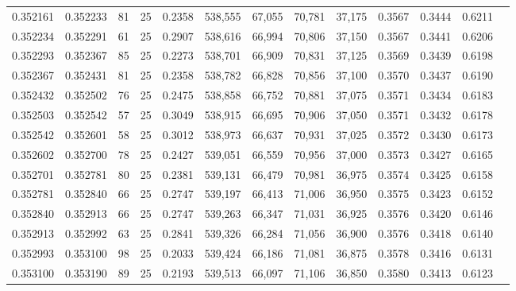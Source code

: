 \begin{tabular}{rrrrrrrrrrrrr}
0.352161 & 0.352233 &    81 &  25 &                                     0.2358 & 538,555 &  67,055 &  70,781 &  37,175 & 0.3567 & 0.3444 & 0.6211 \\
0.352234 & 0.352291 &    61 &  25 &                                     0.2907 & 538,616 &  66,994 &  70,806 &  37,150 & 0.3567 & 0.3441 & 0.6206 \\
0.352293 & 0.352367 &    85 &  25 &                                     0.2273 & 538,701 &  66,909 &  70,831 &  37,125 & 0.3569 & 0.3439 & 0.6198 \\
0.352367 & 0.352431 &    81 &  25 &                                     0.2358 & 538,782 &  66,828 &  70,856 &  37,100 & 0.3570 & 0.3437 & 0.6190 \\
0.352432 & 0.352502 &    76 &  25 &                                     0.2475 & 538,858 &  66,752 &  70,881 &  37,075 & 0.3571 & 0.3434 & 0.6183 \\
0.352503 & 0.352542 &    57 &  25 &                                     0.3049 & 538,915 &  66,695 &  70,906 &  37,050 & 0.3571 & 0.3432 & 0.6178 \\
0.352542 & 0.352601 &    58 &  25 &                                     0.3012 & 538,973 &  66,637 &  70,931 &  37,025 & 0.3572 & 0.3430 & 0.6173 \\
0.352602 & 0.352700 &    78 &  25 &                                     0.2427 & 539,051 &  66,559 &  70,956 &  37,000 & 0.3573 & 0.3427 & 0.6165 \\
0.352701 & 0.352781 &    80 &  25 &                                     0.2381 & 539,131 &  66,479 &  70,981 &  36,975 & 0.3574 & 0.3425 & 0.6158 \\
0.352781 & 0.352840 &    66 &  25 &                                     0.2747 & 539,197 &  66,413 &  71,006 &  36,950 & 0.3575 & 0.3423 & 0.6152 \\
0.352840 & 0.352913 &    66 &  25 &                                     0.2747 & 539,263 &  66,347 &  71,031 &  36,925 & 0.3576 & 0.3420 & 0.6146 \\
0.352913 & 0.352992 &    63 &  25 &                                     0.2841 & 539,326 &  66,284 &  71,056 &  36,900 & 0.3576 & 0.3418 & 0.6140 \\
0.352993 & 0.353100 &    98 &  25 &                                     0.2033 & 539,424 &  66,186 &  71,081 &  36,875 & 0.3578 & 0.3416 & 0.6131 \\
0.353100 & 0.353190 &    89 &  25 &                                     0.2193 & 539,513 &  66,097 &  71,106 &  36,850 & 0.3580 & 0.3413 & 0.6123 \\

\end{tabular}

